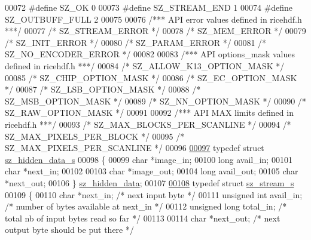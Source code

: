 \begin{DoxyCode}
00072 \textcolor{preprocessor}{#define SZ\_OK            0}
00073 \textcolor{preprocessor}{#define SZ\_STREAM\_END    1}
00074 \textcolor{preprocessor}{#define SZ\_OUTBUFF\_FULL 2}
00075 
00076 \textcolor{comment}{/*** API error values defined in ricehdf.h ***/}
00077 \textcolor{comment}{/* SZ\_STREAM\_ERROR */}
00078 \textcolor{comment}{/* SZ\_MEM\_ERROR    */}
00079 \textcolor{comment}{/* SZ\_INIT\_ERROR   */}
00080 \textcolor{comment}{/* SZ\_PARAM\_ERROR  */}
00081 \textcolor{comment}{/* SZ\_NO\_ENCODER\_ERROR  */}
00082 
00083 \textcolor{comment}{/*** API options\_mask values defined in ricehdf.h ***/}
00084 \textcolor{comment}{/* SZ\_ALLOW\_K13\_OPTION\_MASK */}
00085 \textcolor{comment}{/* SZ\_CHIP\_OPTION\_MASK      */}
00086 \textcolor{comment}{/* SZ\_EC\_OPTION\_MASK        */}
00087 \textcolor{comment}{/* SZ\_LSB\_OPTION\_MASK       */}
00088 \textcolor{comment}{/* SZ\_MSB\_OPTION\_MASK       */}
00089 \textcolor{comment}{/* SZ\_NN\_OPTION\_MASK        */}
00090 \textcolor{comment}{/* SZ\_RAW\_OPTION\_MASK       */}
00091 
00092 \textcolor{comment}{/*** API MAX limits defined in ricehdf.h ***/}
00093 \textcolor{comment}{/* SZ\_MAX\_BLOCKS\_PER\_SCANLINE */}
00094 \textcolor{comment}{/* SZ\_MAX\_PIXELS\_PER\_BLOCK    */}
00095 \textcolor{comment}{/* SZ\_MAX\_PIXELS\_PER\_SCANLINE */}
00096 
\hyperlink{structsz__hidden__data__s}{00097} \textcolor{keyword}{typedef} \textcolor{keyword}{struct }\hyperlink{structsz__hidden__data__s}{sz\_hidden\_data\_s}
00098     \{
00099     \textcolor{keywordtype}{char} *image\_in;
00100     \textcolor{keywordtype}{long} avail\_in;
00101     \textcolor{keywordtype}{char} *next\_in;
00102 
00103     \textcolor{keywordtype}{char} *image\_out;
00104     \textcolor{keywordtype}{long} avail\_out;
00105     \textcolor{keywordtype}{char} *next\_out;
00106     \} \hyperlink{structsz__hidden__data__s}{sz\_hidden\_data};
00107 
\hyperlink{structsz__stream__s}{00108} \textcolor{keyword}{typedef} \textcolor{keyword}{struct }\hyperlink{structsz__stream__s}{sz\_stream\_s}
00109     \{
00110     \textcolor{keywordtype}{char}            *next\_in;  \textcolor{comment}{/* next input byte */}
00111     \textcolor{keywordtype}{unsigned} \textcolor{keywordtype}{int}    avail\_in;  \textcolor{comment}{/* number of bytes available at next\_in */}
00112     \textcolor{keywordtype}{unsigned} \textcolor{keywordtype}{long}    total\_in;  \textcolor{comment}{/* total nb of input bytes read so far */}
00113 
00114     \textcolor{keywordtype}{char}            *next\_out; \textcolor{comment}{/* next output byte should be put there */}

\end{DoxyCode}
